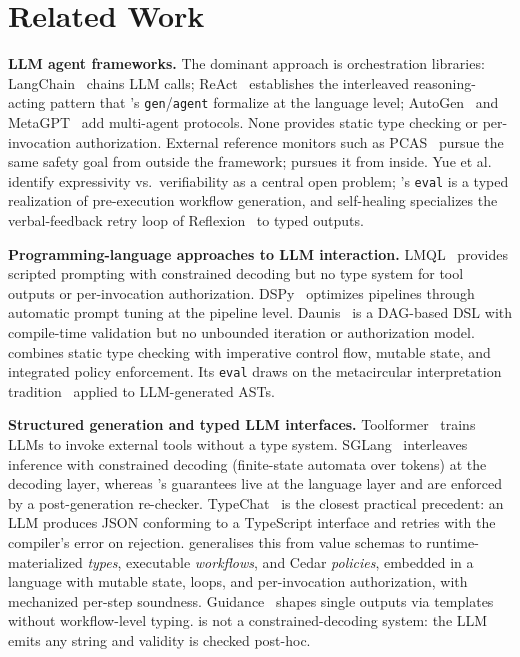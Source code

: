 \section{Related Work}
\label{sec:related}

\textbf{LLM agent frameworks.} The dominant approach is orchestration libraries: LangChain~\cite{langchain2022} chains LLM calls; ReAct~\cite{yao2022react} establishes the interleaved reasoning-acting pattern that \pact{}'s \texttt{gen}/\texttt{agent} formalize at the language level; AutoGen~\cite{wu2024autogen} and MetaGPT~\cite{hong2023metagpt} add multi-agent protocols. None provides static type checking or per-invocation authorization. External reference monitors such as PCAS~\cite{palumbo2026policy} pursue the same safety goal from outside the framework; \pact{} pursues it from inside. Yue et al.~\cite{yue2026statictemplatesdynamicruntime} identify expressivity vs.\ verifiability as a central open problem; \pact{}'s \texttt{eval} is a typed realization of pre-execution workflow generation, and self-healing specializes the verbal-feedback retry loop of Reflexion~\cite{shinn2024reflexion} to typed outputs.

\textbf{Programming-language approaches to LLM interaction.} LMQL~\cite{beurer2023prompting} provides scripted prompting with constrained decoding but no type system for tool outputs or per-invocation authorization. DSPy~\cite{khattab2023dspy} optimizes pipelines through automatic prompt tuning at the pipeline level. Daunis~\cite{daunis2025declarative} is a DAG-based DSL with compile-time validation but no unbounded iteration or authorization model. \pact combines static type checking with imperative control flow, mutable state, and integrated policy enforcement. Its \texttt{eval} draws on the metacircular interpretation tradition~\cite{mccarthy1960recursive,reynolds1972definitional} applied to LLM-generated ASTs.

\begin{sloppypar}
\textbf{Structured generation and typed LLM interfaces.} Toolformer~\cite{schick2023toolformer} trains LLMs to invoke external tools without a type system. SGLang~\cite{zheng2024sglang} interleaves inference with constrained decoding (finite-state automata over tokens) at the decoding layer, whereas \pact{}'s guarantees live at the language layer and are enforced by a post-generation re-checker. TypeChat~\cite{typechat2023} is the closest practical precedent: an LLM produces JSON conforming to a TypeScript interface and retries with the compiler's error on rejection. \pact{} generalises this from value schemas to runtime-materialized \emph{types}, executable \emph{workflows}, and Cedar \emph{policies}, embedded in a language with mutable state, loops, and per-invocation authorization, with mechanized per-step soundness. Guidance~\cite{guidance2023} shapes single outputs via templates without workflow-level typing. \pact{} is not a constrained-decoding system: the LLM emits any string and validity is checked post-hoc.
\end{sloppypar}

